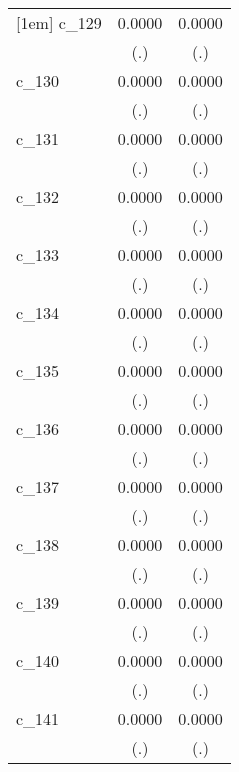 {\begin{tabular}{l*{2}{c}}
[1em]
c\_129       &      0.0000        &      0.0000        \\
            &         (.)        &         (.)        \\
[1em]
c\_130       &      0.0000        &      0.0000        \\
            &         (.)        &         (.)        \\
[1em]
c\_131       &      0.0000        &      0.0000        \\
            &         (.)        &         (.)        \\
[1em]
c\_132       &      0.0000        &      0.0000        \\
            &         (.)        &         (.)        \\
[1em]
c\_133       &      0.0000        &      0.0000        \\
            &         (.)        &         (.)        \\
[1em]
c\_134       &      0.0000        &      0.0000        \\
            &         (.)        &         (.)        \\
[1em]
c\_135       &      0.0000        &      0.0000        \\
            &         (.)        &         (.)        \\
[1em]
c\_136       &      0.0000        &      0.0000        \\
            &         (.)        &         (.)        \\
[1em]
c\_137       &      0.0000        &      0.0000        \\
            &         (.)        &         (.)        \\
[1em]
c\_138       &      0.0000        &      0.0000        \\
            &         (.)        &         (.)        \\
[1em]
c\_139       &      0.0000        &      0.0000        \\
            &         (.)        &         (.)        \\
[1em]
c\_140       &      0.0000        &      0.0000        \\
            &         (.)        &         (.)        \\
[1em]
c\_141       &      0.0000        &      0.0000        \\
            &         (.)        &         (.)        \\

\end{tabular}}
